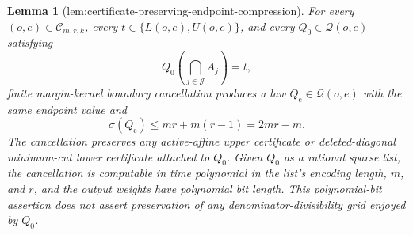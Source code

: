 \documentclass{article}
\newtheorem{lemma}{Lemma}
\begin{document}
\begin{lemma}[lem:certificate-preserving-endpoint-compression]\label{lem:certificate-preserving-endpoint-compression}
For every \((o,e)\in\mathcal C_{m,r,k}\), every \(t\in\{L(o,e),U(o,e)\}\), and every \(Q_0\in\mathcal Q(o,e)\) satisfying
\[
 Q_0\!\left(\bigcap_{j\in\mathcal J}A_j\right)=t,
\]
finite margin-kernel boundary cancellation produces a law \(Q_{\mathrm c}\in\mathcal Q(o,e)\) with the same endpoint value and
\[
 \sigma(Q_{\mathrm c})\leq mr+m(r-1)=2mr-m.
\]
The cancellation preserves any active-affine upper certificate or deleted-diagonal minimum-cut lower certificate attached to \(Q_0\).  Given \(Q_0\) as a rational sparse list, the cancellation is computable in time polynomial in the list's encoding length, \(m\), and \(r\), and the output weights have polynomial bit length.  This polynomial-bit assertion does not assert preservation of any denominator-divisibility grid enjoyed by \(Q_0\).
\end{lemma}
\end{document}
